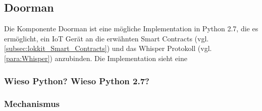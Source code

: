 \subsection{Doorman}
Die Komponente Doorman ist eine mögliche Implementation in Python 2.7, die es ermöglicht, ein IoT Gerät an die erwähnten Smart Contracts (vgl. \ref{subsec:lokkit_Smart_Contracts}) und das Whisper Protokoll (vgl. \ref{para:Whisper}) anzubinden. 
Die Implementation sieht eine 

\subsubsection{Wieso Python? Wieso Python 2.7?}
\subsubsection{Mechanismus}




